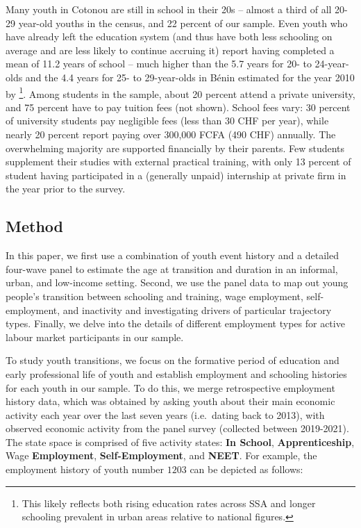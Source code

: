 \documentclass[
  a4paper, twoside, 12pt]{book}
\begin{document}
Many youth in Cotonou are still in school in their 20s -- almost a third of all 20-29 year-old youths in the census, and 22 percent of our sample. Even youth who have already left the education system (and thus have both less schooling on average and are less likely to continue accruing it) report having completed a mean of 11.2 years of school -- much higher than the 5.7 years for 20- to 24-year-olds and the 4.4 years for 25- to 29-year-olds in Bénin estimated for the year 2010 by \textcite{barro2013}\footnote{This likely reflects both rising education rates across SSA and longer schooling prevalent in urban areas relative to national figures.}. Among students in the sample, about 20 percent attend a private university, and 75 percent have to pay tuition fees (not shown). School fees vary: 30 percent of university students pay negligible fees (less than 30 CHF per year), while nearly 20 percent report paying over 300,000 FCFA (490 CHF) annually. The overwhelming majority are supported financially by their parents. Few students supplement their studies with external practical training, with only 13 percent of student having participated in a (generally unpaid) internship at private firm in the year prior to the survey.

\hypertarget{survey-method}{%
\subsection*{Method}\label{survey-method}}

In this paper, we first use a combination of youth event history and a detailed four-wave panel to estimate the age at transition and duration in an informal, urban, and low-income setting. Second, we use the panel data to map out young people's transition between schooling and training, wage employment, self-employment, and inactivity and investigating drivers of particular trajectory types. Finally, we delve into the details of different employment types for active labour market participants in our sample.

To study youth transitions, we focus on the formative period of education and early professional life of youth and establish employment and schooling histories for each youth in our sample. To do this, we merge retrospective employment history data, which was obtained by asking youth about their main economic activity each year over the last seven years (i.e.~dating back to 2013), with observed economic activity from the panel survey (collected between 2019-2021). The state space is comprised of five activity states: \textbf{In School}, \textbf{Apprenticeship}, Wage \textbf{Employment}, \textbf{Self-Employment}, and \textbf{NEET}. For example, the employment history of youth number \(1203\) can be depicted as follows:
\end{document}
